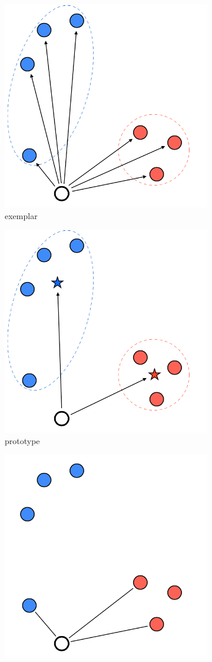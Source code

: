 \documentclass[output=paper]{langsci/langscibook}
\begin{document}
\begin{figure}
\begin{subfigure}[b]{.32\textwidth}
  \centering
  \includegraphics[width=.7\linewidth]{figures/GREWAL_exemplar.png}
  \caption{exemplar}
\end{subfigure}\begin{subfigure}[b]{.32\textwidth}
  \centering
  \includegraphics[width=.7\linewidth]{figures/GREWAL_prototype.png}
  \caption{prototype}
\end{subfigure}\begin{subfigure}[b]{.32\textwidth}
  \centering
  \includegraphics[width=.7\linewidth]{figures/GREWAL_nn.png}

\end{subfigure}
\end{figure}
\end{document}
